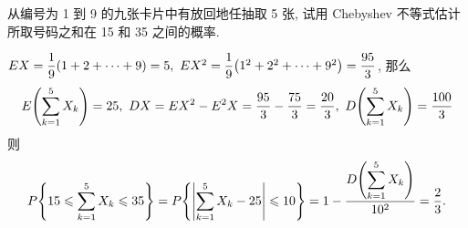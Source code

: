 \begin{example}
    从编号为 1 到 9 的九张卡片中有放回地任抽取 5 张, 试用 Chebyshev 不等式估计所取号码之和在 15 和 35 之间的概率.
\end{example}
\begin{solution}
    $EX=\dfrac{1}{9}(1+2+ \cdots +9)=5,~EX^2=\dfrac{1}{9}\qty(1^2+2^2+ \cdots +9^2)=\dfrac{95}{3}$, 那么 
    $$
    E\qty(\displaystyle \sum_{k=1}^{5} X_k)=25,~DX=EX^2-E^2X=\dfrac{95}{3}-\dfrac{75}{3}=\dfrac{20}{3},~D\qty(\displaystyle \sum_{k=1}^{5} X_k)=\dfrac{100}{3}
    $$
    则 $$
    P\qty{15\leqslant \displaystyle \sum_{k=1}^{5} X_k\leqslant 35}=P\qty{\qty|\displaystyle \sum_{k=1}^{5} X_k-25|\leqslant 10}=1-\dfrac{D\qty(\displaystyle \sum_{k=1}^{5} X_k)}{10^2}=\dfrac{2}{3}.
    $$
\end{solution}